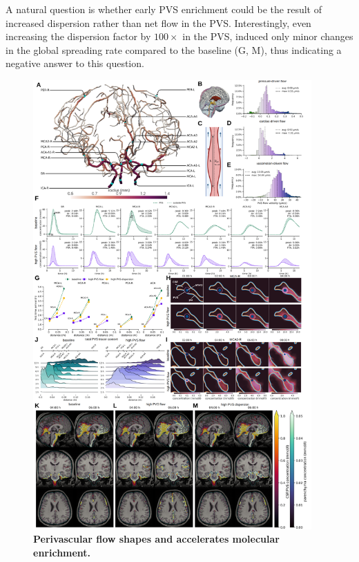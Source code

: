 \documentclass[fleqn,10pt]{wlscirep}
\begin{document}
A natural question is whether early PVS enrichment could be the result
of increased dispersion rather than net flow in the
PVS\cite{asgari2016glymphatic,keith2019dispersion,bojarskaite2023sleep,asgari2016glymphatic,troyetsky2021dispersion}. Interestingly,
even increasing the dispersion factor by $100 \times$ in the PVS,
induced only minor changes in the global spreading rate compared to the
baseline (G, M), thus indicating a negative answer to
this question.
\begin{figure}
    \centering
    \includegraphics[width=0.95\textwidth]{figures/figure3.png}
    \caption{\textbf{Perivascular flow shapes and accelerates molecular enrichment.}}
    \label{fig:pvs}
\end{figure}
\end{document}
